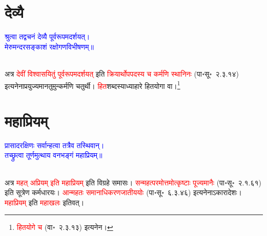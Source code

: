 \section[देव्यै]{देव्यै}
\centering\textcolor{blue}{श्रुत्वा तद्वचनं देव्यै पूर्वरूपमदर्शयत्।\nopagebreak\\
मेरुमन्दरसङ्काशं रक्षोगणविभीषणम्॥}\nopagebreak\\
\\
\begin{sloppypar}\justifying\noindent\hspace{10mm} अत्र \textcolor{red}{देवीं विश्वासयितुं पूर्व\-रूपमदर्शयत्‌} इति \textcolor{red}{क्रियार्थोपपदस्य च कर्मणि स्थानिनः} (पा॰सू॰~२.३.१४) इत्यनेनाप्रयुज्यमान\-तुमुन्कर्मणि चतुर्थी। \textcolor{red}{हित}शब्दस्याध्याहारे हित\-योगा वा।\footnote{\textcolor{red}{हित\-योगे च} (वा॰~२.३.१३) इत्यनेन।}\end{sloppypar}
\section[महाप्रियम्]{महाप्रियम्‌}
\centering\textcolor{blue}{प्रासादरक्षिणः सर्वान्हत्वा तत्रैव तस्थिवान्।\nopagebreak\\
तच्छ्रुत्वा तूर्णमुत्थाय वनभङ्गं महाप्रियम्॥}\nopagebreak\\
\\
\begin{sloppypar}\justifying\noindent\hspace{10mm} अत्र \textcolor{red}{महत् अप्रियम् इति महाप्रियम्‌} इति विग्रहे समासः। \textcolor{red}{सन्महत्परमोत्तमोत्कृष्टाः पूज्यमानैः} (पा॰सू॰~२.१.६१) इति सूत्रेण कर्मधारयः। \textcolor{red}{आन्महतः समानाधिकरणजातीययोः} (पा॰सू॰~६.३.४६) इत्यनेनाऽकारादेशः। \textcolor{red}{महाप्रियम्‌} इति \textcolor{red}{महाखलः} इतिवत्।\end{sloppypar}
